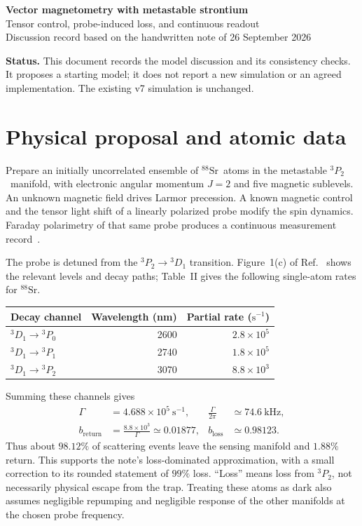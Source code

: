 \documentclass[11pt,letterpaper]{article}
\newcommand{\Sr}{${}^{88}\mathrm{Sr}$}
\newcommand{\Ptwo}{${}^{3}P_2$}
\begin{document}
\begin{center}
{\LARGE\bfseries Vector magnetometry with metastable strontium}\\[7pt]
{\large Tensor control, probe-induced loss, and continuous readout}\\[6pt]
{\small Discussion record based on the handwritten note of 26 September 2026}
\end{center}

\textbf{Status.} This document records the model discussion and its consistency
checks. It proposes a starting model; it does not report a new simulation or an
agreed implementation. The existing v7 simulation is unchanged.

\section{Physical proposal and atomic data}

Prepare an initially uncorrelated ensemble of \Sr\ atoms in the metastable
\Ptwo\ manifold, with electronic angular momentum $J=2$ and five magnetic
sublevels. An unknown magnetic field drives Larmor precession. A known magnetic
control and the tensor light shift of a linearly polarized probe modify the
spin dynamics. Faraday polarimetry of that same probe produces a continuous
measurement record~\cite{note}.

The probe is detuned from the ${}^{3}P_2\rightarrow{}^{3}D_1$ transition.
Figure~1(c) of Ref.~\cite{masson} shows the relevant levels and decay paths;
Table~II gives the following single-atom rates for \Sr.

\begin{center}
\begin{tabular}{@{}lrr@{}}
\toprule
Decay channel & Wavelength (nm) & Partial rate ($\mathrm{s}^{-1}$)\\
\midrule
${}^{3}D_1\rightarrow{}^{3}P_0$ & 2600 & $2.8\times10^5$\\
${}^{3}D_1\rightarrow{}^{3}P_1$ & 2740 & $1.8\times10^5$\\
${}^{3}D_1\rightarrow{}^{3}P_2$ & 3070 & $8.8\times10^3$\\
\bottomrule
\end{tabular}
\end{center}

Summing these channels gives
\begin{align}
\Gamma &=4.688\times10^5\ \mathrm{s}^{-1},
& \frac{\Gamma}{2\pi}&\simeq74.6\ \mathrm{kHz},\label{eq:linewidth}\\
b_{\mathrm{return}}&=\frac{8.8\times10^3}{\Gamma}\simeq0.01877,
& b_{\mathrm{loss}}&\simeq0.98123.\label{eq:branching}
\end{align}
Thus about $98.12\%$ of scattering events leave the sensing manifold and
$1.88\%$ return. This supports the note's loss-dominated approximation, with a
small correction to its rounded statement of $99\%$ loss. ``Loss'' means loss
from \Ptwo, not necessarily physical escape from the trap. Treating these atoms
as dark also assumes negligible repumping and negligible response of the other
manifolds at the chosen probe frequency.
\end{document}
